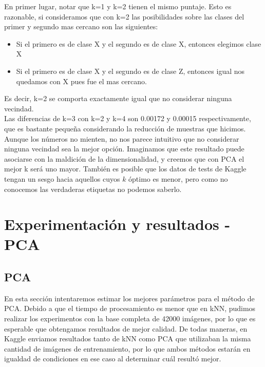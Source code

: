 En primer lugar, notar que k=1 y k=2 tienen el mismo puntaje. Esto es razonable, si consideramos que con k=2 las posibilidades sobre las clases del primer y segundo mas cercano son las siguientes: \\
\begin{itemize}
\item Si el primero es de clase X y el segundo es de clase X, entonces elegimos clase X
\item Si el primero es de clase X y el segundo es de clase Z, entonces igual nos quedamos con X pues fue el mas cercano.
\end{itemize}

Es decir, k=2 se comporta exactamente igual que no considerar ninguna vecindad. \\

Las diferencias de k=3 con k=2 y k=4 son 0.00172 y 0.00015 respectivamente, que es bastante pequeña considerando la reducción de muestras que hicimos. \\

Aunque los números no mienten, no nos parece intuitivo que no considerar ninguna vecindad sea la mejor opción. Imaginamos que este resultado puede asociarse con la maldición de la dimensionalidad, y creemos que con PCA el mejor k será uno mayor. También es posible que los datos de tests de Kaggle tengan un sesgo hacia aquellos cuyos $k$ óptimo es menor, pero como no conocemos las verdaderas etiquetas no podemos saberlo. \\


\section{Experimentación y resultados - PCA}

\subsection{PCA}

En esta sección intentaremos estimar los mejores parámetros para el método de PCA. Debido a que el tiempo de procesamiento es menor que en kNN, pudimos realizar los experimentos con la base completa de 42000 imágenes, por lo que es esperable que obtengamos resultados de mejor calidad. De todas maneras, en Kaggle enviamos resultados tanto de kNN como PCA que utilizaban la misma cantidad de imágenes de entrenamiento, por lo que ambos métodos estarán en igualdad de condiciones en ese caso al determinar cuál resultó mejor. \\

